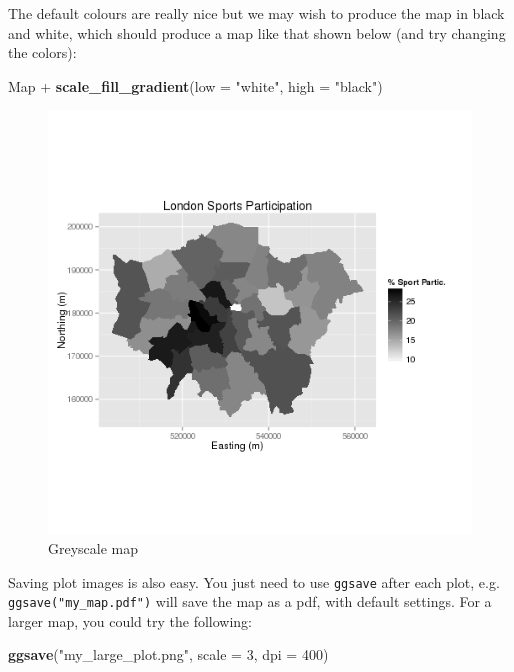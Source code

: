 \documentclass[]{article}
\newenvironment{Shaded}{}{}
\newcommand{\KeywordTok}[1]{\textcolor[rgb]{0.00,0.44,0.13}{\textbf{{#1}}}}
\newcommand{\DataTypeTok}[1]{\textcolor[rgb]{0.56,0.13,0.00}{{#1}}}
\newcommand{\DecValTok}[1]{\textcolor[rgb]{0.25,0.63,0.44}{{#1}}}
\newcommand{\StringTok}[1]{\textcolor[rgb]{0.25,0.44,0.63}{{#1}}}
\newcommand{\NormalTok}[1]{{#1}}
\begin{document}
The default colours are really nice but we may wish to produce the map
in black and white, which should produce a map like that shown below
(and try changing the colors):

\begin{Shaded}
\begin{Highlighting}[]
\NormalTok{Map +}\StringTok{ }\KeywordTok{scale_fill_gradient}\NormalTok{(}\DataTypeTok{low =} \StringTok{"white"}\NormalTok{, }\DataTypeTok{high =} \StringTok{"black"}\NormalTok{)}
\end{Highlighting}
\end{Shaded}

\begin{figure}[htbp]
\centering
\includegraphics{figure/Greyscale_map.png}
\caption{Greyscale map}
\end{figure}

Saving plot images is also easy. You just need to use \texttt{ggsave}
after each plot, e.g. \texttt{ggsave("my\_map.pdf")} will save the map
as a pdf, with default settings. For a larger map, you could try the
following:

\begin{Shaded}
\begin{Highlighting}[]
\KeywordTok{ggsave}\NormalTok{(}\StringTok{"my_large_plot.png"}\NormalTok{, }\DataTypeTok{scale =} \DecValTok{3}\NormalTok{, }\DataTypeTok{dpi =} \DecValTok{400}\NormalTok{)}
\end{Highlighting}
\end{Shaded}
\end{document}
